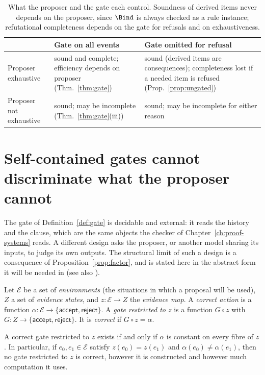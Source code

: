 \begin{table}[ht]
\centering
\small
\begin{tabular}{@{}p{3.9cm}p{4.0cm}p{4.0cm}@{}}
\toprule
 & Gate on all events & Gate omitted for refusal\\
\midrule
Proposer exhaustive & sound and complete; efficiency depends on proposer (Thm.~\ref{thm:gate}) & sound (derived items are consequences); completeness lost if a needed item is refused (Prop.~\ref{prop:ungated})\\
Proposer not exhaustive & sound; may be incomplete (Thm.~\ref{thm:gate}(iii)) & sound; may be incomplete for either reason\\
\bottomrule
\end{tabular}
\caption{What the proposer and the gate each control. Soundness of derived items never depends on the proposer, since $\Bind$ is always checked as a rule instance; refutational completeness depends on the gate for refusals and on exhaustiveness.}
\label{tab:gate}
\end{table}

\section[Self-contained gates]{Self-contained gates cannot discriminate what the proposer cannot}
\label{sec:selfgate}

The gate of Definition~\ref{def:gate} is decidable and external: it reads the history and the clause, which are the same objects the checker of Chapter~\ref{ch:proof-systems} reads. A different design asks the proposer, or another model sharing its inputs, to judge its own outputs. The structural limit of such a design is a consequence of Proposition~\ref{prop:factor}, and is stated here in the abstract form it will be needed in (see also \cite{flyxion-grounding}).

\begin{definition}
\label{def:env-gate}
Let $\mathcal E$ be a set of \emph{environments} (the situations in which a proposal will be used), $Z$ a set of \emph{evidence states}, and $z:\mathcal E\to Z$ the \emph{evidence map}. A \emph{correct action} is a function $\alpha:\mathcal E\to\{\textsf{accept},\textsf{reject}\}$. A \emph{gate restricted to $z$} is a function $G\circ z$ with $G:Z\to\{\textsf{accept},\textsf{reject}\}$. It is \emph{correct} if $G\circ z=\alpha$.
\end{definition}

\begin{theorem}
\label{thm:selfgate}
A correct gate restricted to $z$ exists if and only if $\alpha$ is constant on every fibre of $z$. In particular, if $e_0,e_1\in\mathcal E$ satisfy $z(e_0)=z(e_1)$ and $\alpha(e_0)\ne\alpha(e_1)$, then no gate restricted to $z$ is correct, however it is constructed and however much computation it uses.
\end{theorem}

